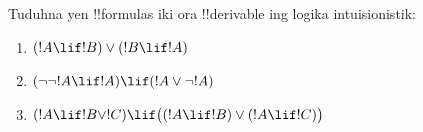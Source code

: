 \documentclass[../../../include/open-logic-section]{subfiles}
\begin{document}
\begin{prob}
  Tuduhna yen !!{formula}s iki ora !!{derivable} ing logika
  intuisionistik:
  \begin{enumerate}
    \item $(!A \lif !B) \lor (!B \lif !A)$
    \item $(\lnot\lnot !A \lif !A) \lif (!A \lor \lnot !A)$
    \item $(!A \lif !B \lor !C) \lif \bigl((!A \lif !B)\lor(!A \lif !C)\bigr)$
  \end{enumerate}
\end{prob}
\end{document}
